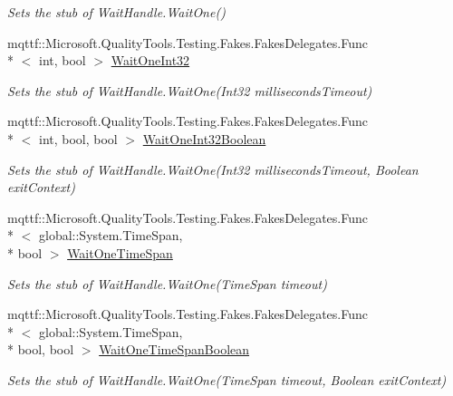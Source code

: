 \begin{DoxyCompactItemize}
\begin{DoxyCompactList}\small\item\em Sets the stub of Wait\-Handle.\-Wait\-One()\end{DoxyCompactList}\item 
mqttf\-::\-Microsoft.\-Quality\-Tools.\-Testing.\-Fakes.\-Fakes\-Delegates.\-Func\\*
$<$ int, bool $>$ \hyperlink{class_system_1_1_threading_1_1_fakes_1_1_stub_wait_handle_af951b78398dec40484075ef137f0ca18}{Wait\-One\-Int32}
\begin{DoxyCompactList}\small\item\em Sets the stub of Wait\-Handle.\-Wait\-One(\-Int32 milliseconds\-Timeout)\end{DoxyCompactList}\item 
mqttf\-::\-Microsoft.\-Quality\-Tools.\-Testing.\-Fakes.\-Fakes\-Delegates.\-Func\\*
$<$ int, bool, bool $>$ \hyperlink{class_system_1_1_threading_1_1_fakes_1_1_stub_wait_handle_a3c4acf5e97de622dabea38338fb41244}{Wait\-One\-Int32\-Boolean}
\begin{DoxyCompactList}\small\item\em Sets the stub of Wait\-Handle.\-Wait\-One(\-Int32 milliseconds\-Timeout, Boolean exit\-Context)\end{DoxyCompactList}\item 
mqttf\-::\-Microsoft.\-Quality\-Tools.\-Testing.\-Fakes.\-Fakes\-Delegates.\-Func\\*
$<$ global\-::\-System.\-Time\-Span, \\*
bool $>$ \hyperlink{class_system_1_1_threading_1_1_fakes_1_1_stub_wait_handle_a0eb1041568164752e0c0cd5e044d0f52}{Wait\-One\-Time\-Span}
\begin{DoxyCompactList}\small\item\em Sets the stub of Wait\-Handle.\-Wait\-One(\-Time\-Span timeout)\end{DoxyCompactList}\item 
mqttf\-::\-Microsoft.\-Quality\-Tools.\-Testing.\-Fakes.\-Fakes\-Delegates.\-Func\\*
$<$ global\-::\-System.\-Time\-Span, \\*
bool, bool $>$ \hyperlink{class_system_1_1_threading_1_1_fakes_1_1_stub_wait_handle_a2d774694347ecea3785691ac676dbcc7}{Wait\-One\-Time\-Span\-Boolean}
\begin{DoxyCompactList}\small\item\em Sets the stub of Wait\-Handle.\-Wait\-One(\-Time\-Span timeout, Boolean exit\-Context)\end{DoxyCompactList}\end{DoxyCompactItemize}
